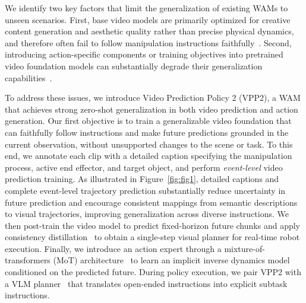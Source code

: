 
We identify two key factors that limit the generalization of existing WAMs to unseen scenarios. First, base video models are primarily optimized for creative content generation and aesthetic quality rather than precise physical dynamics, and therefore often fail to follow manipulation instructions faithfully~\citep{chen2025large,zhang2026qwen}. Second, introducing action-specific components or training objectives into pretrained video foundation models can substantially degrade their generalization capabilities~\citep{mishra2026understanding}.

To address these issues, we introduce Video Prediction Policy 2 (VPP2), a WAM that achieves strong zero-shot generalization in both video prediction and action generation. Our first objective is to train a generalizable video foundation that can faithfully follow instructions and make future predictions grounded in the current observation, without unsupported changes to the scene or task. To this end, we annotate each clip with a detailed caption specifying the manipulation process, active end effector, and target object, and perform \textit{event-level} video prediction training. As illustrated in Figure~\ref{fig:fig1}, detailed captions and complete event-level trajectory prediction substantially reduce uncertainty in future prediction and encourage consistent mappings from semantic descriptions to visual trajectories, improving generalization across diverse instructions. We then post-train the video model to predict fixed-horizon future chunks and apply consistency distillation~\citep{song2023consistency} to obtain a single-step visual planner for real-time robot execution. Finally, we introduce an action expert through a mixture-of-transformers (MoT) architecture~\citep{liang2025mixture} to learn an implicit inverse dynamics model conditioned on the predicted future. During policy execution, we pair VPP2 with a VLM planner~\citep{bai2025qwen3,seed2026seed2} that translates open-ended instructions into explicit subtask instructions.

